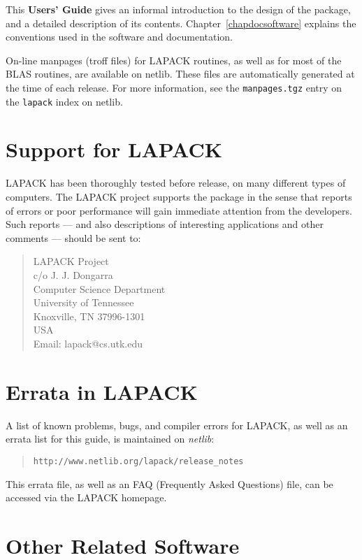 This {\bf Users' Guide} gives an informal introduction to
the design of the package, and a detailed description of its contents.
Chapter~\ref{chapdocsoftware} explains the conventions used in the
software and documentation.

On-line manpages (troff files) for LAPACK routines, as well as for most of
the BLAS routines, are available on netlib.  These files are
automatically generated at the time of each release.  For more
information, see the {\tt manpages.tgz} entry on the {\tt lapack}
index on netlib.

\section{Support for LAPACK}

LAPACK has been thoroughly tested before release, on many different
types of computers.
The LAPACK project supports the package in the sense that reports
of errors or poor performance will gain immediate attention from the
developers. 
Such reports --- and also descriptions of interesting 
applications and other comments --- should be sent to:
\begin{quote}
LAPACK Project\\
c/o J. J. Dongarra\\
Computer Science Department\\
University of Tennessee\\   
Knoxville, TN 37996-1301\\
USA\\   
Email: lapack@cs.utk.edu\\   
\end{quote}

\section{Errata in LAPACK}

A list of known problems, bugs, and compiler errors for LAPACK,
as well as an errata list for this guide, is maintained on {\em netlib}:
\begin{quote}
{\tt http://www.netlib.org/lapack/release\_notes}
\end{quote}

This errata file, as well as an FAQ (Frequently Asked Questions) file,
can be accessed via the LAPACK homepage.

\section{Other Related Software}\label{relsoftware}

